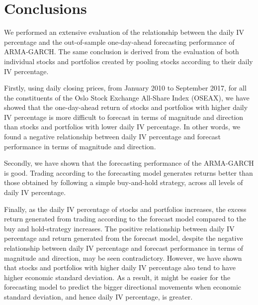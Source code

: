 
\chapter{Conclusions}

We performed an extensive evaluation of the relationship between the daily IV percentage and the out-of-sample one-day-ahead forecasting performance of ARMA-GARCH. The same conclusion is derived from the evaluation of both individual stocks and portfolios created by pooling stocks according to their daily IV percentage. 

Firstly, using daily closing prices, from January 2010 to September 2017, for all the constituents of the Oslo Stock Exchange All-Share Index (OSEAX), we have showed that the one-day-ahead return of stocks and portfolios with higher daily IV percentage is more difficult to forecast in terms of magnitude and direction than stocks and portfolios with lower daily IV percentage. In other words, we found a negative relationship between daily IV percentage and forecast performance in terms of magnitude and direction. 

Secondly, we have shown that the forecasting performance of the ARMA-GARCH is good. Trading according to the forecasting model generates returns better than those obtained by following a simple buy-and-hold strategy, across all levels of daily IV percentage. 

Finally, as the  daily IV percentage of stocks and portfolios increases, the excess return generated from trading according to the forecast model compared to the buy and hold-strategy increases. The positive relationship between daily IV percentage and return generated from the forecast model, despite the negative relationship between daily IV percentage and forecast performance in terms of magnitude and direction, may be seen contradictory. However, we have shown that stocks and portfolios with higher daily IV percentage also tend to have higher economic standard deviation. As a result, it might be easier for the forecasting model to predict the bigger directional movements when economic standard deviation, and hence daily IV percentage, is greater. 